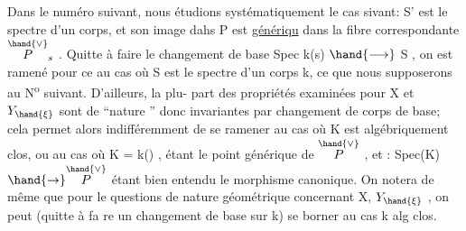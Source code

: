 Dans le numéro suivant, nous étudions systématiquement le cas
sivant: S' est le spectre d'un corps, et son image dahs P est \uline{génériqu}
dans la fibre correspondante $\overset{\hand{\vee}}{P}_s$ . Quitte à faire le changement de base
Spec k(s) $\hand{\longrightarrow}$ S , on est ramené pour ce au cas où S est le spectre
d'un corps k, ce que nous supposerons au N\textsuperscript{o} suivant. D'ailleurs, la plu-%
part des propriétés examinées pour X et $Y_{\hand{\xi}}$ sont de ``nature ''
donc invariantes par changement de corps de base; cela permet alors
indifféremment de se ramener au cas où K est algébriquement clos, ou au
cas où K = k(\hand{$\eta$}) , \hand{$\eta$} étant le point générique de $\overset{\hand{\vee}}{P}$ , et \hand{$\xi$} : Spec(K)$\hand{\to}\overset{\hand{\vee}}{P}$
étant bien entendu le morphisme canonique. On notera de même que pour le
questions de nature géométrique concernant X, $Y_{\hand{\xi}}$ , on peut (quitte à fa
re un changement de base sur k) se borner au cas k alg clos.

